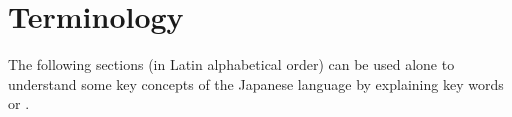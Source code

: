 \chapter{Terminology}
\label{chap:Terminology}
\label{sec:Terminology}

The following sections (in Latin alphabetical order) can be used alone to
understand some key concepts of the Japanese language by explaining key words
or .

\begingroup
\setlength{\cftbeforejterminologyskip}{-2em}
\listofjterminology
\endgroup


